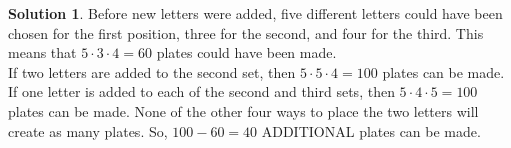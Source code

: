 \documentclass{article}
\theoremstyle{definition}
\newtheorem*{solution}{Solution}
\begin{document}
\begin{multicols}{2}
\begin{enumerate}
            \begin{solution}
                Before new letters were added, five different letters could have been chosen for the first position, three for the second, and four for the third.
                This means that $5 \cdot 3 \cdot 4 = 60$ plates could have been made. \\
                If two letters are added to the second set, then $5 \cdot 5 \cdot 4 = 100$ plates can be made.
                If one letter is added to each of the second and third sets, then $5 \cdot 4 \cdot 5 = 100$ plates can be made.
                None of the other four ways to place the two letters will create as many plates.
                So, $100 - 60 = 40$ ADDITIONAL plates can be made.
            \end{solution}
    \end{enumerate}
\end{multicols}
\end{document}
